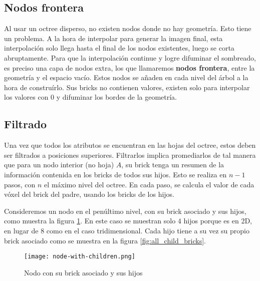 
\subsection{Nodos frontera}

Al usar un octree disperso, no existen nodos donde no hay geometría.
Esto tiene un problema.
A la hora de interpolar para generar la imagen final, esta interpolación solo llega hasta el final de los nodos existentes, luego se corta abruptamente.
Para que la interpolación continue y logre difuminar el sombreado, es preciso una capa de nodos extra, los que llamaremos \textbf{nodos frontera}, entre la geometría y el espacio vacío.
Estos nodos se añaden en cada nivel del árbol a la hora de construírlo.
Sus bricks no contienen valores, existen solo para interpolar los valores con 0 y difuminar los bordes de la geometría.


\subsection{Filtrado}\label{design:filtering}

Una vez que todos los atributos se encuentran en las hojas del octree, estos deben ser filtrados a posiciones superiores.
Filtrarlos implica promediarlos de tal manera que para un nodo interior (no hoja) $A$, su brick tenga un resumen de la información contenida en los bricks de todos sus hijos.
Esto se realiza en $n - 1$ pasos, con $n$ el máximo nivel del octree.
En cada paso, se calcula el valor de cada vóxel del brick del padre, usando los bricks de los hijos.

Consideremos un nodo en el penúltimo nivel, con su brick asociado y sus hijos, como muestra la figura \ref{fig:node_with_children}.
En este caso se muestran solo $4$ hijos porque es en 2D, en lugar de $8$ como en el caso tridimensional.
Cada hijo tiene a su vez su propio brick asociado como se muestra en la figura \ref{fig:all_child_bricks}.

\begin{figure}[h!]
    \centering
    \texttt{[image: node-with-children.png]}
    \caption{Nodo con su brick asociado y sus hijos}
    \label{fig:node_with_children}
\end{figure}

